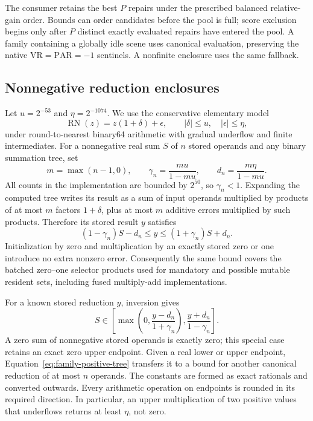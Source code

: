 \documentclass[11pt]{article}
\begin{document}
The consumer retains the best $P$ repairs under the prescribed balanced relative-gain order. Bounds can order candidates before the pool is full; score exclusion begins only after $P$ distinct exactly evaluated repairs have entered the pool. A family containing a globally idle scene uses canonical evaluation, preserving the native $\mathrm{VR}=\mathrm{PAR}=-1$ sentinels. A nonfinite enclosure uses the same fallback.

\subsection{Nonnegative reduction enclosures}

Let $u=2^{-53}$ and $\eta=2^{-1074}$.  We use the conservative elementary model
\[
 \operatorname{RN}(z)=z(1+\delta)+\epsilon,
 \qquad |\delta|\le u,\quad |\epsilon|\le\eta,
\]
under round-to-nearest binary64 arithmetic with gradual underflow and finite intermediates.  For a nonnegative real sum $S$ of $n$ stored operands and any binary summation tree, set
\[
 m=\max(n-1,0),\qquad
 \gamma_n=\frac{mu}{1-mu},\qquad
 d_n=\frac{m\eta}{1-mu}.
\]
All counts in the implementation are bounded by $2^{50}$, so $\gamma_n<1$. Expanding the computed tree writes its result as a sum of input operands multiplied by products of at most $m$ factors $1+\delta$, plus at most $m$ additive errors multiplied by such products.  Therefore its stored result $y$ satisfies
\begin{equation}
 (1-\gamma_n)S-d_n\le y\le(1+\gamma_n)S+d_n.
 \label{eq:family-positive-tree}
\end{equation}
Initialization by zero and multiplication by an exactly stored zero or one introduce no extra nonzero error.  Consequently the same bound covers the batched zero--one selector products used for mandatory and possible mutable resident sets, including fused multiply-add implementations.

For a known stored reduction $y$, inversion gives
\begin{equation}
 S\in\left[
 \max\left(0,\frac{y-d_n}{1+\gamma_n}\right),
 \frac{y+d_n}{1-\gamma_n}\right].
 \label{eq:family-invert-sum}
\end{equation}
A zero sum of nonnegative stored operands is exactly zero; this special case retains an exact zero upper endpoint.  Given a real lower or upper endpoint, Equation~\eqref{eq:family-positive-tree} transfers it to a bound for another canonical reduction of at most $n$ operands.  The constants are formed as exact rationals and converted outwards. Every arithmetic operation on endpoints is rounded in its required direction.  In particular, an upper multiplication of two positive values that underflows returns at least $\eta$, not zero.
\end{document}
